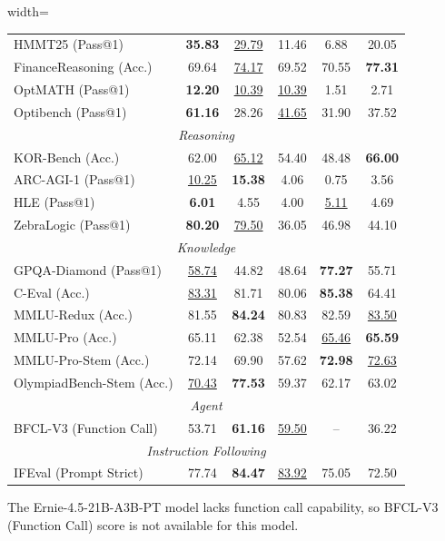 \begin{table}[t]
\begin{adjustbox}{width=\linewidth}
\begin{threeparttable}
\begin{tabular}{lccccc}
     HMMT25 (Pass@1) & \textbf{35.83} & \underline{29.79} & 11.46 & 6.88 & 20.05 \\
     FinanceReasoning (Acc.) & 69.64 & \underline{74.17} & 69.52 & 70.55 & \textbf{77.31} \\
     OptMATH (Pass@1) & \textbf{12.20} & \underline{10.39} & \underline{10.39} & 1.51 & 2.71 \\
     Optibench (Pass@1) & \textbf{61.16} & 28.26 & \underline{41.65} & 31.90 & 37.52 \\
     \midrule \multicolumn{6}{c}{\textit{Reasoning}} \\
    \midrule KOR-Bench (Acc.) & 62.00 & \underline{65.12} & 54.40 & 48.48 & \textbf{66.00} \\
     ARC-AGI-1 (Pass@1) & \underline{10.25} & \textbf{15.38} & 4.06 & 0.75 & 3.56 \\
     HLE (Pass@1) & \textbf{6.01} & 4.55 & 4.00 & \underline{5.11} & 4.69 \\
     ZebraLogic (Pass@1) & \textbf{80.20} & \underline{79.50} & 36.05 & 46.98 & 44.10 \\
    \midrule \multicolumn{6}{c}{\textit{Knowledge}} \\
    \midrule GPQA-Diamond (Pass@1) & \underline{58.74} & 44.82 & 48.64 & \textbf{77.27} & 55.71 \\
     C-Eval (Acc.) & \underline{83.31} & 81.71 & 80.06 & \textbf{85.38} & 64.41 \\
     MMLU-Redux (Acc.) & 81.55 & \textbf{84.24} & 80.83 & 82.59 & \underline{83.50} \\
     MMLU-Pro (Acc.) & 65.11 & 62.38 & 52.54 & \underline{65.46} & \textbf{65.59} \\
     MMLU-Pro-Stem (Acc.) & 72.14 & 69.90 & 57.62 & \textbf{72.98} & \underline{72.63} \\
     OlympiadBench-Stem (Acc.) & \underline{70.43} & \textbf{77.53} & 59.37 & 62.17 & 63.02 \\
    \midrule \multicolumn{6}{c}{\textit{Agent}} \\
    \midrule BFCL-V3 (Function Call)\tnote{1} & 53.71 & \textbf{61.16} & \underline{59.50} & -- & 36.22 \\
    \midrule \multicolumn{6}{c}{\textit{Instruction Following}} \\
    \midrule IFEval (Prompt Strict) & 77.74 & \textbf{84.47} & \underline{83.92} & 75.05 & 72.50 \\
    \hline
    \end{tabular}
    \begin{tablenotes}
        \footnotesize
        \item[1] The Ernie-4.5-21B-A3B-PT model lacks function call capability, so BFCL-V3 (Function Call) score is not available for this model.
    \end{tablenotes}
    \end{threeparttable}
    \end{adjustbox}
\end{table}

